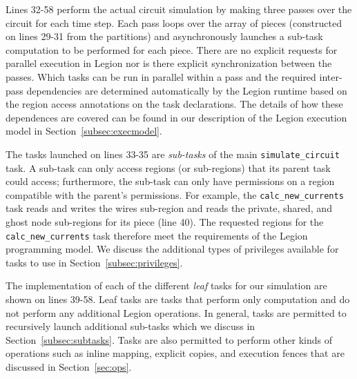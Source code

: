 Lines 32-58 perform the actual circuit simulation 
by making three passes over the circuit for each 
time step.  Each pass loops over the array of 
pieces (constructed on lines 29-31 from the 
partitions) and asynchronously launches a sub-task 
computation to be performed for each piece. There 
are  no explicit requests for parallel execution 
in Legion nor is there 
explicit synchronization between the passes.  
Which tasks can be run in parallel within a 
pass and the required inter-pass dependencies are
determined automatically by the Legion runtime 
based on the region access annotations on the 
task declarations. The details of how these
dependences are covered can be found in our
description of the Legion execution model
in Section~\ref{subsec:execmodel}.

The tasks launched on lines 33-35 are 
{\em sub-tasks} of the main {\tt simulate\_circuit} 
task. A sub-task can only access regions (or 
sub-regions) that its parent task could access; 
furthermore, the sub-task can only have permissions 
on a region compatible with the parent's permissions. 
For example, the {\tt calc\_new\_currents} task reads 
and writes the wires sub-region and reads 
the private, shared, and ghost node sub-regions 
for its piece (line 40). The requested regions for the 
{\tt calc\_new\_currents} task therefore meet
the requirements of the Legion programming model.
We discuss the additional types of privileges available
for tasks to use in Section~\ref{subsec:privileges}.

The implementation of each of the different {\em leaf}
tasks for our simulation are shown on lines 39-58.
Leaf tasks are tasks that perform only computation
and do not perform any additional Legion operations.
In general, tasks are permitted to recursively launch
additional sub-tasks which we discuss in 
Section~\ref{subsec:subtasks}. Tasks are also permitted
to perform other kinds of operations such as inline
mapping, explicit copies, and execution fences that
are discussed in Section~\ref{sec:ops}.




